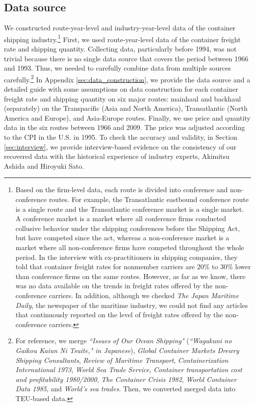 \documentclass[11pt]{article}
\begin{document}
\subsection{Data source}\label{subsec:data}
We constructed route-year-level and industry-year-level data of the container shipping industry.\footnote{Based on the firm-level data, each route is divided into conference and non-conference routes. For example, the Transatlantic eastbound conference route is a single route and the Transatlantic conference market is a single market. A conference market is a market where all conference firms conducted collusive behavior under the shipping conferences before the Shipping Act, but have competed since the act, whereas a non-conference market is a market where all non-conference firms have competed throughout the whole period. In the interview with ex-practitioners in shipping companies, they told that container freight rates for nonmember carriers are 20\% to 30\% lower than conference firms on the same routes. However, as far as we know, there was no data available on the trends in freight rates offered by the non-conference carriers. In addition, although we checked \textit{The Japan Maritime Daily}, the newspaper of the maritime industry, we could not find any articles that continuously reported on the level of freight rates offered by the non-conference carriers. } First, we used route-year-level data of the container freight rate and shipping quantity. Collecting data, particularly before 1994, was not trivial because there is no single data source that covers the period between 1966 and 1993. Thus, we needed to carefully combine data from multiple sources carefully.\footnote{For reference, we merge \textit{``Issues of Our Ocean Shipping"} (\textit{``Wagakuni no Gaikou Kaiun Ni Tsuite," in Japanese}), \textit{Global Container Markets Drewry Shipping Consultants}, \textit{Review of Maritime Transport}, \textit{Containerization International 1973}, \textit{World Sea Trade Service}, \textit{Container transportation cost and profitability 1980/2000}, \textit{The Container Crisis 1982}, \textit{World Container Data 1985}, and \textit{World's sea trades}. Then, we converted merged data into TEU-based data.} In Appendix \ref{sec:data_construction}, we provide the data source and a detailed guide with some assumptions on data construction for each container freight rate and shipping quantity on six major routes: mainhaul and backhaul (separately) on the Transpacific (Asia and North America), Transatlantic (North America and Europe), and Asia-Europe routes. Finally, we use price and quantity data in the six routes between 1966 and 2009. The price was adjusted according to the CPI in the U.S. in 1995. To check the accuracy and validity, in Section \ref{sec:interview}, we provide interview-based evidence on the consistency of our recovered data with the historical experience of industry experts, Akimitsu Ashida and Hiroyuki Sato.
\end{document}
